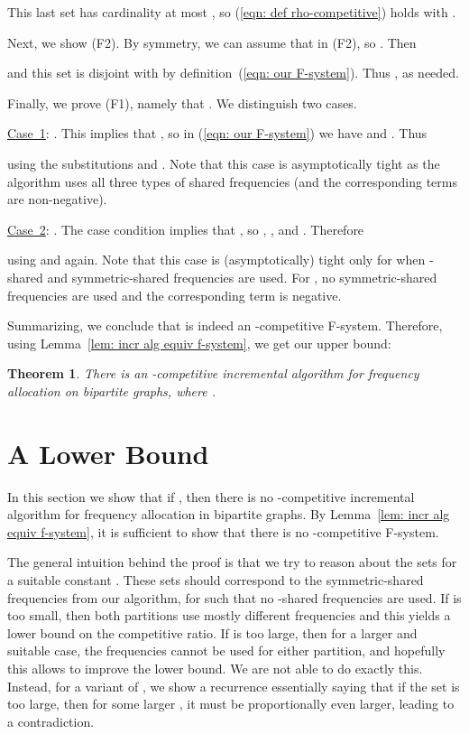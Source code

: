 \documentclass[11pt]{article}
\newcommand{\mycase}[1]{\mbox{{\underline{Case #1}}:\/}}
\newtheorem{theorem}{Theorem}[section]
\begin{document}
This last set has cardinality at most
,  
so (\ref{eqn: def rho-competitive}) holds with .

\smallskip

Next, we show (F2). By symmetry, we can assume that  in (F2),
so . Then

and this set is disjoint with  by definition~(\ref{eqn: our F-system}). 
Thus , as needed.

\smallskip

Finally, we prove (F1), namely that . We
distinguish two cases.
\begin{description}

\item{{\mycase{1}}} . 
This implies that , so in (\ref{eqn: our F-system}) we have
 and .
Thus

using the substitutions  and .
Note that this case is asymptotically
tight as the algorithm uses all
three types of shared frequencies (and the corresponding terms are
non-negative). 

\item{{\mycase{2}}} . 
The case condition implies that
, so ,
, and 
. Therefore

using  and  again. Note that this case is
(asymptotically) tight only for  when -shared and
symmetric-shared frequencies are used. For , no
symmetric-shared frequencies are used and the corresponding term is
negative. 
\end{description}

Summarizing, we conclude that  is indeed an -competitive
F-system. Therefore, using Lemma~\ref{lem: incr alg equiv f-system}, we get
our upper bound:



\begin{theorem}
There is an -competitive incremental
algorithm for frequency allocation on bipartite graphs, where
.
\end{theorem}



\section{A Lower Bound}
\label{sec: a lower bound}

In this section we show that if , then there is no -competitive 
incremental algorithm for frequency allocation in bipartite graphs.
By Lemma~\ref{lem: incr alg equiv f-system}, it is sufficient to
show that there is no -competitive F-system. 

The general intuition behind the proof is that we try to reason about
the sets  for a suitable
constant .  These sets should correspond to the
symmetric-shared frequencies from our algorithm, for  such
that no -shared frequencies are used. If  is too small, then
both partitions use mostly different frequencies and this yields a
lower bound on the competitive ratio. If  is too large, then for
a larger  and suitable case, the frequencies cannot be used for
either partition, and hopefully this allows to improve the lower
bound. We are not able to do exactly this. Instead, for a variant of
, we show a recurrence essentially saying that if the set is too
large, then for some larger , it must be proportionally even
larger, leading to a contradiction.
\end{document}

